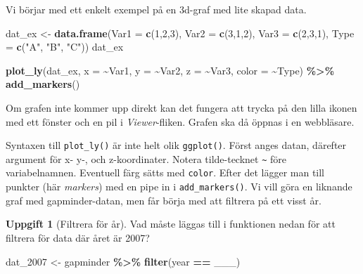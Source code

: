 \documentclass[
]{book}
\newenvironment{Shaded}{\begin{snugshade}}{\end{snugshade}}
\newcommand{\AttributeTok}[1]{\textcolor[rgb]{0.13,0.29,0.53}{#1}}
\newcommand{\DecValTok}[1]{\textcolor[rgb]{0.00,0.00,0.81}{#1}}
\newcommand{\FunctionTok}[1]{\textcolor[rgb]{0.13,0.29,0.53}{\textbf{#1}}}
\newcommand{\NormalTok}[1]{#1}
\newcommand{\OtherTok}[1]{\textcolor[rgb]{0.56,0.35,0.01}{#1}}
\newcommand{\SpecialCharTok}[1]{\textcolor[rgb]{0.81,0.36,0.00}{\textbf{#1}}}
\newcommand{\StringTok}[1]{\textcolor[rgb]{0.31,0.60,0.02}{#1}}
\theoremstyle{definition}
\theoremstyle{definition}
\theoremstyle{definition}
\newtheorem{exercise}{Uppgift}[chapter]
\theoremstyle{definition}
\theoremstyle{remark}
\begin{document}
Vi börjar med ett enkelt exempel på en 3d-graf med lite skapad data.

\begin{Shaded}
\begin{Highlighting}[]
\NormalTok{dat\_ex }\OtherTok{\textless{}{-}} \FunctionTok{data.frame}\NormalTok{(}\AttributeTok{Var1 =} \FunctionTok{c}\NormalTok{(}\DecValTok{1}\NormalTok{,}\DecValTok{2}\NormalTok{,}\DecValTok{3}\NormalTok{), }\AttributeTok{Var2 =} \FunctionTok{c}\NormalTok{(}\DecValTok{3}\NormalTok{,}\DecValTok{1}\NormalTok{,}\DecValTok{2}\NormalTok{), }
                     \AttributeTok{Var3 =} \FunctionTok{c}\NormalTok{(}\DecValTok{2}\NormalTok{,}\DecValTok{3}\NormalTok{,}\DecValTok{1}\NormalTok{), }\AttributeTok{Type =} \FunctionTok{c}\NormalTok{(}\StringTok{"A"}\NormalTok{, }\StringTok{"B"}\NormalTok{, }\StringTok{"C"}\NormalTok{))}
\NormalTok{dat\_ex}

\FunctionTok{plot\_ly}\NormalTok{(dat\_ex, }\AttributeTok{x =} \SpecialCharTok{\textasciitilde{}}\NormalTok{Var1, }\AttributeTok{y =} \SpecialCharTok{\textasciitilde{}}\NormalTok{Var2, }
        \AttributeTok{z =} \SpecialCharTok{\textasciitilde{}}\NormalTok{Var3, }\AttributeTok{color =} \SpecialCharTok{\textasciitilde{}}\NormalTok{Type) }\SpecialCharTok{\%\textgreater{}\%}
  \FunctionTok{add\_markers}\NormalTok{()}
\end{Highlighting}
\end{Shaded}

Om grafen inte kommer upp direkt kan det fungera att trycka på den lilla ikonen med ett fönster och en pil i \emph{Viewer}-fliken. Grafen ska då öppnas i en webbläsare.

Syntaxen till \texttt{plot\_ly()} är inte helt olik \texttt{ggplot()}. Först anges datan, därefter argument för x- y-, och z-koordinater. Notera tilde-tecknet \texttt{\textasciitilde{}} före variabelnamnen. Eventuell färg sätts med \texttt{color}. Efter det lägger man till punkter (här \emph{markers}) med en pipe in i \texttt{add\_markers()}. Vi vill göra en liknande graf med gapminder-datan, men får börja med att filtrera på ett visst år.

\begin{exercise}[Filtrera för år]

Vad måste läggas till i funktionen nedan för att filtrera för data där året är 2007?

\begin{Shaded}
\begin{Highlighting}[]
\NormalTok{dat\_2007 }\OtherTok{\textless{}{-}}\NormalTok{ gapminder }\SpecialCharTok{\%\textgreater{}\%} 
  \FunctionTok{filter}\NormalTok{(year }\SpecialCharTok{==}\NormalTok{ \_\_\_)}
\end{Highlighting}
\end{Shaded}

\end{exercise}
\end{document}
